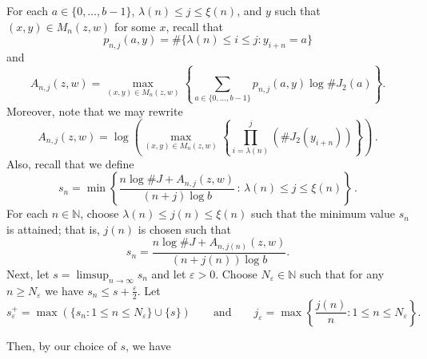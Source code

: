 \documentclass[12pt]{article}
\theoremstyle{remark}
\numberwithin{equation}{section}
\renewcommand{\Bbb}[1]{\mathbb{#1}}
\newcommand{\N}{{\Bbb N}}         %
\newcommand{\0}{\mathbf{0}}
\begin{document}
For each $a \in \{0, \dots , b-1\}$, $\lambda(n) \leq j \leq \xi(n)$, and $y$ such that $(x,y) \in M_{n}(z,w)$ {for some $x$}, recall that
 \begin{equation*}
    p_{n,j}(a, y)=\#\{\lambda(n) \leq i \leq j : y_{i+n}=a \}
 \end{equation*}
 and
 \begin{equation*}
   A_{n,j}(z,w)=\max_{(x,y) \in M_{n}(z,w)} \left\{ \sum_{a \in \{0, \dots , b-1\}} p_{n,j}(a, y) \log\#J_{2}(a) \right\}.   
 \end{equation*}
Moreover, note that {we may rewrite}
\begin{equation*}
 A_{n,j}(z,w)=\log \left( \max_{(x,y) \in M_{n}(z,w)} \left\{\prod_{i=\lambda(n)}^{j}(\#J_{2}(y_{i+n})) \right\} \right)\, .
 \end{equation*}
Also, recall that we define
\begin{equation*}
    s_{n}=\min\left\{ \frac{n\log\#J + A_{n,j}(z,w)}{(n+j)\log b} \, : \, \lambda(n) \leq j \leq \xi(n) \right\}\, . 
\end{equation*}
For each $n \in \N$, choose $\lambda(n) \leq j(n) \leq \xi(n)$ such that the minimum value $s_{n}$ is attained; that is, $j(n)$ is chosen such that
 \begin{equation*}
     s_{n}=\frac{n\log\#J+A_{n,j(n)}(z,w)}{(n+j(n))\log b}.
 \end{equation*}
Next, let $s=\limsup_{n \to \infty} s_{n}$ {and let $\varepsilon > 0$. Choose $N_{\varepsilon} \in \N$ such that for any $n \geq N_{\varepsilon}$ we have $s_n \leq s+\frac{\varepsilon}{2}$. Let 
\[s^+_{\varepsilon} = \max\left(\{s_n : 1 \leq n \leq N_{\varepsilon}\} \cup \{s\}\right) \qquad \text{and} \qquad j_{\varepsilon}=\max\left\{\frac{j(n)}{n}: 1 \leq n \leq N_{\varepsilon}\right\}.\]}

Then, {by our choice of $s$,} we have 
 
\end{document}
